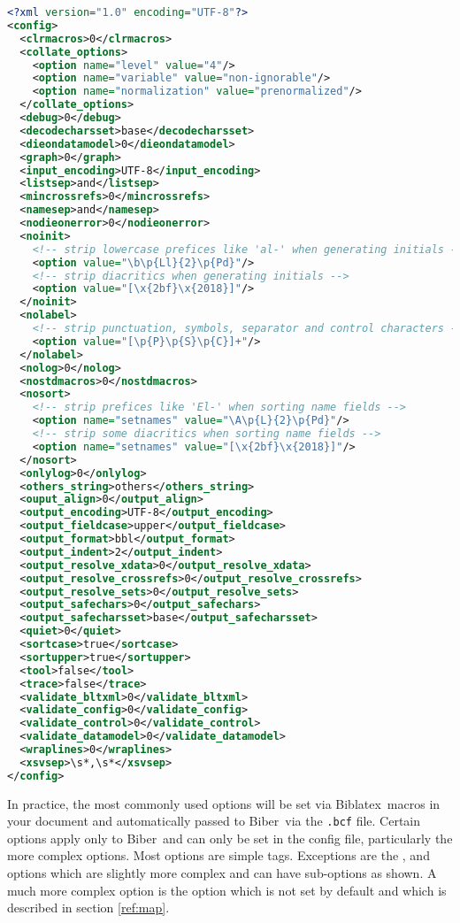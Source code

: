 \documentclass{ltxdockit}
\newcommand*{\biber}{Biber\xspace}
\newcommand*{\biblatex}{Biblatex\xspace}
\begin{document}
\begin{lstlisting}[language=xml]
<?xml version="1.0" encoding="UTF-8"?>
<config>
  <clrmacros>0</clrmacros>
  <collate_options>
    <option name="level" value="4"/>
    <option name="variable" value="non-ignorable"/>
    <option name="normalization" value="prenormalized"/>
  </collate_options>
  <debug>0</debug>
  <decodecharsset>base</decodecharsset>
  <dieondatamodel>0</dieondatamodel>
  <graph>0</graph>
  <input_encoding>UTF-8</input_encoding>
  <listsep>and</listsep>
  <mincrossrefs>0</mincrossrefs>
  <namesep>and</namesep>
  <nodieonerror>0</nodieonerror>
  <noinit>
    <!-- strip lowercase prefices like 'al-' when generating initials -->
    <option value="\b\p{Ll}{2}\p{Pd}"/>
    <!-- strip diacritics when generating initials -->
    <option value="[\x{2bf}\x{2018}]"/>
  </noinit>
  <nolabel>
    <!-- strip punctuation, symbols, separator and control characters -->
    <option value="[\p{P}\p{S}\p{C}]+"/> 
  </nolabel>
  <nolog>0</nolog>
  <nostdmacros>0</nostdmacros>
  <nosort>
    <!-- strip prefices like 'El-' when sorting name fields -->
    <option name="setnames" value="\A\p{L}{2}\p{Pd}"/>
    <!-- strip some diacritics when sorting name fields -->
    <option name="setnames" value="[\x{2bf}\x{2018}]"/>
  </nosort>
  <onlylog>0</onlylog>
  <others_string>others</others_string>
  <ouput_align>0</output_align>
  <output_encoding>UTF-8</output_encoding>
  <output_fieldcase>upper</output_fieldcase>
  <output_format>bbl</output_format>
  <output_indent>2</output_indent>
  <output_resolve_xdata>0</output_resolve_xdata>
  <output_resolve_crossrefs>0</output_resolve_crossrefs>
  <output_resolve_sets>0</output_resolve_sets>
  <output_safechars>0</output_safechars>
  <output_safecharsset>base</output_safecharsset>
  <quiet>0</quiet>
  <sortcase>true</sortcase>
  <sortupper>true</sortupper>
  <tool>false</tool>
  <trace>false</trace>
  <validate_bltxml>0</validate_bltxml>
  <validate_config>0</validate_config>
  <validate_control>0</validate_control>
  <validate_datamodel>0</validate_datamodel>
  <wraplines>0</wraplines>
  <xsvsep>\s*,\s*</xsvsep>
</config>
\end{lstlisting}

\noindent In practice, the most commonly used options will be set via
\biblatex\ macros in your document and automatically passed to \biber\
via the \verb+.bcf+ file. Certain options apply only to \biber\ and can
only be set in the config file, particularly the more complex
options. Most options are simple tags. Exceptions are the
,  and  options which are slightly
more complex and can have sub-options as shown. A much more complex
option is the \opt{sourcemap} option which is not set by default and
which is described in section \ref{ref:map}.
\end{document}

